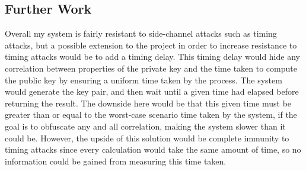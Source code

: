 \documentclass[12pt,a4paper]{article}
\begin{document}
\subsection{Further Work} \noindent
Overall my system is fairly resistant to side-channel attacks such as timing attacks, 
but a possible extension to the project in order to increase resistance to timing attacks would be to add a timing delay. 
This timing delay would hide any correlation between properties of the private key and the time taken to compute the public key by ensuring a uniform time taken by the process. 
The system would generate the key pair, and then wait until a given time had elapsed before returning the result. 
The downside here would be that this given time must be greater than or equal to the worst-case scenario time taken by the system, if the goal is to obfuscate any and all correlation, making the system slower than it could be. 
However, the upside of this solution would be complete immunity to timing attacks since every calculation would take the same amount of time, so no information could be gained from measuring this time taken. 



\end{document}
